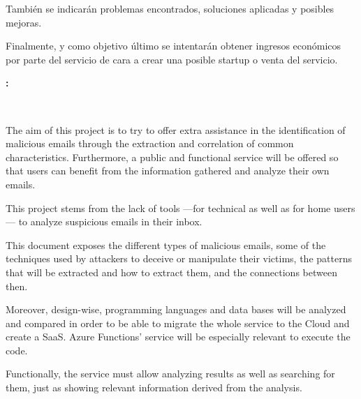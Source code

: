 También se indicarán problemas encontrados, soluciones aplicadas y posibles mejoras.

Finalmente, y como objetivo último se intentarán obtener ingresos económicos por parte del servicio de cara a crear una posible startup o venta del servicio.

\cleardoublepage


\thispagestyle{empty}


\begin{center}
{\large\bfseries \myTitle: \mySubTitle}\\
\end{center}
\begin{center}
\myName\\
\end{center}

\bigskip

\vspace{0.7cm}
\bigskip

The aim of this project is to try to offer extra assistance in the identification of malicious emails through the extraction and correlation of common characteristics. Furthermore, a public and functional service will be offered so that users can benefit from the information gathered and analyze their own emails.

This project stems from the lack of tools —for technical as well as for home users— to analyze suspicious emails in their inbox.

This document exposes the different types of malicious emails, some of the techniques used by attackers to deceive or manipulate their victims, the patterns that will be extracted and how to extract them, and the connections between then.

Moreover, design-wise, programming languages and data bases will be analyzed and compared in order to be able to migrate the whole service to the Cloud and create a SaaS. Azure Functions’ service will be especially relevant to execute the code.

Functionally, the service must allow analyzing results as well as searching for them, just as showing relevant information derived from the analysis. 

\chapter*{}
\thispagestyle{empty}


